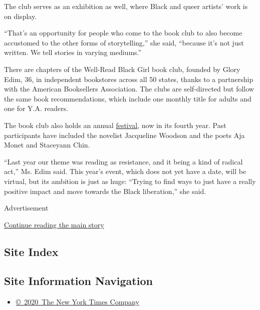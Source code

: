The club serves as an exhibition as well, where Black and queer artists'
work is on display.

``That's an opportunity for people who come to the book club to also
become accustomed to the other forms of storytelling,'' she said,
``because it's not just written. We tell stories in varying mediums.''

There are chapters of the Well-Read Black Girl book club, founded by
Glory Edim, 36, in independent bookstores across all 50 states, thanks
to a partnership with the American Booksellers Association. The clubs
are self-directed but follow the same book recommendations, which
include one monthly title for adults and one for Y.A. readers.

The book club also holds an annual
\href{https://www.wellreadblackgirl.org/}{festival}, now in its fourth
year. Past participants have included the novelist Jacqueline Woodson
and the poets Aja Monet and Staceyann Chin.

``Last year our theme was reading as resistance, and it being a kind of
radical act,'' Ms. Edim said. This year's event, which does not yet have
a date, will be virtual, but its ambition is just as huge: ``Trying to
find ways to just have a really positive impact and move towards the
Black liberation,'' she said.

Advertisement

\protect\hyperlink{after-bottom}{Continue reading the main story}

\hypertarget{site-index}{%
\subsection{Site Index}\label{site-index}}

\hypertarget{site-information-navigation}{%
\subsection{Site Information
Navigation}\label{site-information-navigation}}

\begin{itemize}
\tightlist
\item
  \href{https://help.nytimes.com/hc/en-us/articles/115014792127-Copyright-notice}{©~2020~The
  New York Times Company}
\end{itemize}

